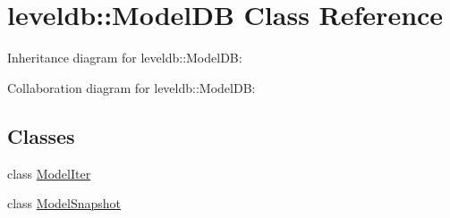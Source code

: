 \hypertarget{classleveldb_1_1_model_d_b}{\section{leveldb\-:\-:Model\-D\-B Class Reference}
\label{classleveldb_1_1_model_d_b}
}


Inheritance diagram for leveldb\-:\-:Model\-D\-B\-:


Collaboration diagram for leveldb\-:\-:Model\-D\-B\-:
\subsection*{Classes}
\begin{DoxyCompactItemize}
\item 
class \hyperlink{classleveldb_1_1_model_d_b_1_1_model_iter}{Model\-Iter}
\item 
class \hyperlink{classleveldb_1_1_model_d_b_1_1_model_snapshot}{Model\-Snapshot}
\end{DoxyCompactItemize}
